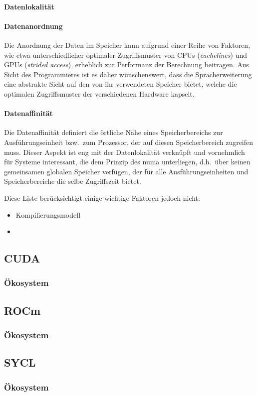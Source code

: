 \paragraph{Datenlokalität}



\paragraph{Datenanordnung}
Die Anordnung der Daten im Speicher kann aufgrund einer Reihe von Faktoren, wie
etwa unterschiedlicher optimaler Zugriffsmuster von CPUs (\textit{cachelines})
und GPUs (\textit{strided access}), erheblich zur Performanz der Berechnung
beitragen. Aus Sicht des Programmieres ist es daher wünschenswert, dass die
Spracherweiterung eine abstrakte Sicht auf den von ihr verwendeten Speicher
bietet, welche die optimalen Zugriffsmuster der verschiedenen Hardware kapselt.

\paragraph{Datenaffinität}

Die Datenaffinität definiert die örtliche Nähe eines Speicherbereichs zur
Ausführungseinheit bzw.\ zum Prozessor, der auf diesen Speicherbereich zugreifen
muss. Dieser Aspekt ist eng mit der Datenlokalität verknüpft und vornehmlich für
Systeme interessant, die dem Prinzip des \gls{numa} unterliegen, d.h.\ über
keinen gemeinsamen globalen Speicher verfügen, der für alle Ausführungseinheiten
und Speicherbereiche die selbe Zugriffszeit bietet.

Diese Liste berücksichtigt einige wichtige Faktoren jedoch nicht:

\begin{itemize}
    \item Kompilierungsmodell
    \item 
\end{itemize}

\subsection{CUDA}

\subsubsection{Ökosystem}

\subsection{ROCm}

\subsubsection{Ökosystem}

\subsection{SYCL}

\subsubsection{Ökosystem}
